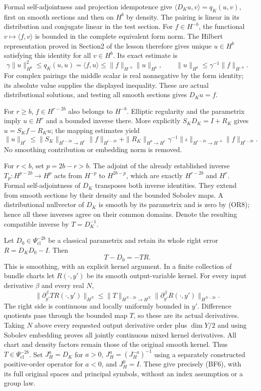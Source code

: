 \documentclass[
  11pt,
]{article}
\begin{document}
Formal self-adjointness and projection idempotence give
\(\langle D_Ku,v\rangle=q_K(u,v)\), first on smooth sections and then on
\(H^b\) by density. The pairing is linear in its distribution and
conjugate linear in the test section. For \(f\in H^{-b}\), the
functional \(v\mapsto\langle f,v\rangle\) is bounded in the complete
equivalent form norm. The Hilbert representation proved in Section2 of
the lesson therefore gives unique \(u\in H^b\) satisfying this identity
for all \(v\in H^b\). Its exact estimate is \[
 \gamma\|u\|_{H^b}^2\leq q_K(u,u)
 =\langle f,u\rangle\leq\|f\|_{H^{-b}}\|u\|_{H^b},
 \qquad \|u\|_{H^b}\leq\gamma^{-1}\|f\|_{H^{-b}}.
 \tag{OR9}
\] For complex pairings the middle scalar is real nonnegative by the
form identity; its absolute value supplies the displayed inequality.
These are actual distributional solutions, and testing all smooth
sections gives \(D_Ku=f\).

For \(r\geq b\), \(f\in H^{r-2b}\) also belongs to \(H^{-b}\). Elliptic
regularity and the parametrix imply \(u\in H^r\) and a bounded inverse
there. More explicitly \(S_KD_K=I+R_K\) gives \(u=S_Kf-R_Ku\); the
mapping estimates yield \[
 \|u\|_{H^r}\leq\|S_K\|_{H^{r-2b}\to H^r}\|f\|_{H^{r-2b}}
 +\|R_K\|_{H^b\to H^r}\gamma^{-1}
 \|\iota\|_{H^{r-2b}\to H^{-b}}\|f\|_{H^{r-2b}}.
 \tag{OR10}
\] No smoothing contribution or embedding norm is removed.

For \(r<b\), set \(p=2b-r>b\). The adjoint of the already established
inverse \(T_p:H^{p-2b}\to H^p\) acts from \(H^{-p}\) to \(H^{2b-p}\),
which are exactly \(H^{r-2b}\) and \(H^r\). Formal self-adjointness of
\(D_K\) transposes both inverse identities. They extend from smooth
sections by their density and the bounded Sobolev maps. A distributional
nullvector of \(D_K\) is smooth by its parametrix and is zero by (OR8);
hence all these inverses agree on their common domains. Denote the
resulting compatible inverse by \(T=D_K^{-1}\).

Let \(D_0\in\Psi^{-2b}_{\mathrm{cl}}\) be a classical parametrix and
retain its whole right error \(R= D_KD_0-I\). Then \[
 T-D_0=-TR.
 \tag{OR11}
\] This is smoothing, with an explicit kernel argument. In a finite
collection of bundle charts let \(R(\cdot,y')\) be its smooth
output-variable kernel. For every input derivative \(\beta\) and every
real \(N\), \[
 \|\partial_{y'}^\beta T R(\cdot,y')\|_{H^N}
 \leq\|T\|_{H^{N-2b}\to H^N}
 \|\partial_{y'}^\beta R(\cdot,y')\|_{H^{N-2b}}.
 \tag{OR12}
\] The right side is continuous and locally uniformly bounded in \(y'\).
Difference quotients pass through the bounded map \(T\), so these are
its actual derivatives. Taking \(N\) above every requested output
derivative order plus \(\dim Y/2\) and using Sobolev embedding proves
all jointly continuous mixed kernel derivatives. All chart and density
factors remain those of the original smooth kernel. Thus
\(T\in\Psi^{-2b}_{\mathrm{cl}}\). Set \(J_H^a=D_K\) for \(a>0\),
\(J_H^a=(J_H^{-a})^{-1}\) using a separately constructed positive-order
operator for \(a<0\), and \(J_H^0=I\). These give precisely (BF6), with
its full original spaces and principal symbols, without an index
assumption or a group law.
\end{document}
